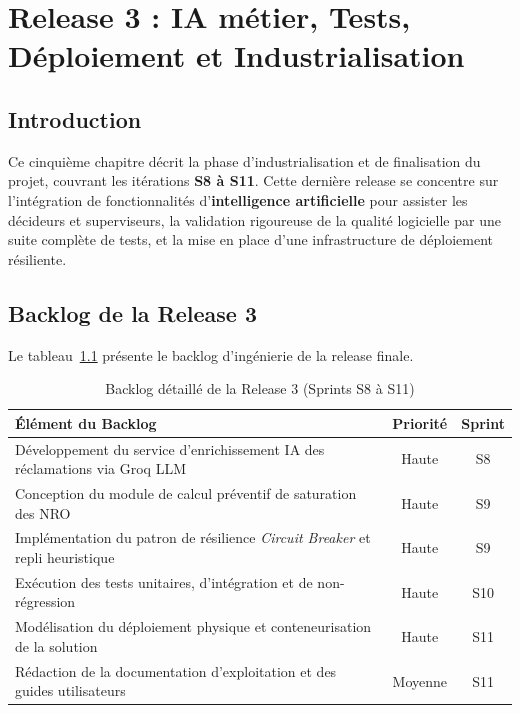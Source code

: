 \chapter{Release 3 : IA m\'etier, Tests, D\'eploiement et Industrialisation}
\label{chap:sprint_ia_deploy}

\section*{Introduction}
Ce cinqui\`eme chapitre d\'ecrit la phase d'industrialisation et de finalisation du projet, couvrant les it\'erations \textbf{S8 \`a S11}. Cette derni\`ere release se concentre sur l'int\'egration de fonctionnalit\'es d'\textbf{intelligence artificielle} pour assister les d\'ecideurs et superviseurs, la validation rigoureuse de la qualit\'e logicielle par une suite compl\`ete de tests, et la mise en place d'une infrastructure de d\'eploiement r\'esiliente.

\section{Backlog de la Release 3}
Le tableau~\ref{tab:backlog-release3} pr\'esente le backlog d'ing\'enierie de la release finale.

\begin{table}[H]
\centering
\begin{tabular}{|p{8.5cm}|c|c|}
\hline
\textbf{\'El\'ement du Backlog} & \textbf{Priorit\'e} & \textbf{Sprint} \\
\hline
D\'eveloppement du service d'enrichissement IA des r\'eclamations via Groq LLM & Haute & S8 \\
\hline
Conception du module de calcul pr\'eventif de saturation des NRO & Haute & S9 \\
\hline
Impl\'ementation du patron de r\'esilience \textit{Circuit Breaker} et repli heuristique & Haute & S9 \\
\hline
Ex\'ecution des tests unitaires, d'int\'egration et de non-r\'egression & Haute & S10 \\
\hline
Mod\'elisation du d\'eploiement physique et conteneurisation de la solution & Haute & S11 \\
\hline
R\'edaction de la documentation d'exploitation et des guides utilisateurs & Moyenne & S11 \\
\hline
\end{tabular}
\caption{Backlog d\'etaill\'e de la Release 3 (Sprints S8 \`a S11)}
\label{tab:backlog-release3}
\end{table}

